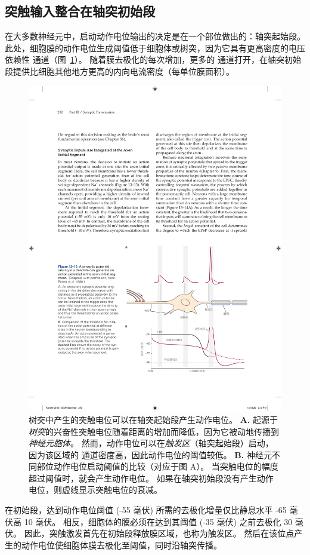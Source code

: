 \subsection{突触输入整合在轴突初始段}

在大多数神经元中，启动动作电位输出的决定是在一个部位做出的：轴突起始段。
此处，细胞膜的动作电位生成阈值低于细胞体或树突，因为它具有更高密度的电压依赖性  通道（图~\ref{fig:13_13}）。
随着膜去极化的每次增加，更多的  通道打开，在轴突初始段提供比细胞其他地方更高的内向电流密度（每单位膜面积）。


\begin{figure}[htbp]
	\centering
	\includegraphics[width=0.75\linewidth]{chap13/fig_13_13}
	\caption{树突中产生的突触电位可以在轴突起始段产生动作电位\cite{eckert1988propagation}。
		\textbf{A.} 起源于\textit{树突}的兴奋性突触电位随着距离的增加而降低，因为它被动地传播到\textit{神经元胞体}。
		然而，动作电位可以在\textit{触发区}（轴突起始段）启动，因为该区域的  通道密度高，因此动作电位的阈值较低。
		\textbf{B.} 神经元不同部位动作电位启动阈值的比较（对应于图 A）。
		当突触电位的幅度超过阈值时，就会产生动作电位。
		如果在轴突初始段没有产生动作电位，则虚线显示突触电位的衰减。}
	\label{fig:13_13}
\end{figure}


在初始段，达到动作电位阈值 (-55 毫伏) 所需的去极化增量仅比静息水平 -65 毫伏高 10 毫伏。
相反，细胞体的膜必须在达到其阈值 (-35 毫伏) 之前去极化 30 毫伏。
因此，突触激发首先在初始段释放膜区域，也称为触发区。
然后在该位点产生的动作电位使细胞体膜去极化至阈值，同时沿轴突传播。



